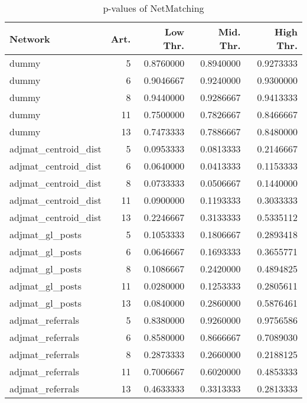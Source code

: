 \begin{table}

\caption{\label{tab:}p-values of NetMatching}
\centering
\begin{tabular}[t]{lrrrr}
\toprule
Network & Art. & Low Thr. & Mid.  Thr. & High  Thr.\\
\midrule
dummy & 5 & 0.8760000 & 0.8940000 & 0.9273333\\
dummy & 6 & 0.9046667 & 0.9240000 & 0.9300000\\
dummy & 8 & 0.9440000 & 0.9286667 & 0.9413333\\
dummy & 11 & 0.7500000 & 0.7826667 & 0.8466667\\
dummy & 13 & 0.7473333 & 0.7886667 & 0.8480000\\
\addlinespace
adjmat\_centroid\_dist & 5 & 0.0953333 & 0.0813333 & 0.2146667\\
adjmat\_centroid\_dist & 6 & 0.0640000 & 0.0413333 & 0.1153333\\
adjmat\_centroid\_dist & 8 & 0.0733333 & 0.0506667 & 0.1440000\\
adjmat\_centroid\_dist & 11 & 0.0900000 & 0.1193333 & 0.3033333\\
adjmat\_centroid\_dist & 13 & 0.2246667 & 0.3133333 & 0.5335112\\
\addlinespace
adjmat\_gl\_posts & 5 & 0.1053333 & 0.1806667 & 0.2893418\\
adjmat\_gl\_posts & 6 & 0.0646667 & 0.1693333 & 0.3655771\\
adjmat\_gl\_posts & 8 & 0.1086667 & 0.2420000 & 0.4894825\\
adjmat\_gl\_posts & 11 & 0.0280000 & 0.1253333 & 0.2805611\\
adjmat\_gl\_posts & 13 & 0.0840000 & 0.2860000 & 0.5876461\\
\addlinespace
adjmat\_referrals & 5 & 0.8380000 & 0.9260000 & 0.9756586\\
adjmat\_referrals & 6 & 0.8580000 & 0.8666667 & 0.7089030\\
adjmat\_referrals & 8 & 0.2873333 & 0.2660000 & 0.2188125\\
adjmat\_referrals & 11 & 0.7006667 & 0.6020000 & 0.4853333\\
adjmat\_referrals & 13 & 0.4633333 & 0.3313333 & 0.2813333\\
\bottomrule
\end{tabular}
\end{table}